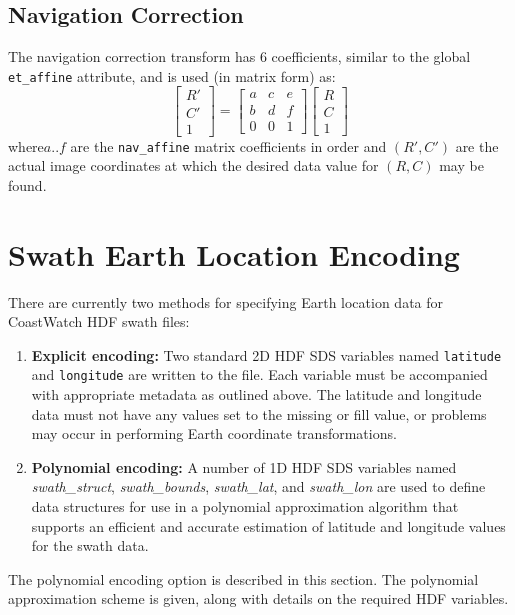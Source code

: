 \subsection{Navigation Correction}

The navigation correction transform has 6 coefficients, similar to
the global {\tt et\_affine} attribute, and is used (in matrix form)
as:
\[
  \left[ \begin{array}{c}
           R' \\
           C' \\
           1
         \end{array}  
  \right]
  = 
  \left[ \begin{array}{ccc}
           a & c & e \\
           b & d & f \\
           0 & 0 & 1
         \end{array}
  \right]
  \left[ \begin{array}{c}
           R \\
           C \\
           1
         \end{array}
  \right]
\]
where$a..f$ are the {\tt nav\_affine} matrix coefficients in order and
$(R',C')$ are the actual image coordinates at which the desired data
value for $(R,C)$ may be found.

\section{Swath Earth Location Encoding}
\label{swath}

There are currently two methods for specifying Earth location data for
CoastWatch HDF swath files: 
\begin{enumerate}

  \item \textbf{Explicit encoding:} Two standard 2D HDF SDS variables
  named {\tt latitude} and {\tt longitude} are written to the
  file. Each variable must be accompanied with appropriate metadata as
  outlined above. The latitude and longitude data must not have any
  values set to the missing or fill value, or problems may occur in
  performing Earth coordinate transformations.

  \item \textbf{Polynomial encoding:} A number of 1D HDF SDS variables
  named {\em swath\_struct}, {\em swath\_bounds}, {\em swath\_lat},
  and {\em swath\_lon} are used to define data structures for use in a
  polynomial approximation algorithm that supports an efficient and
  accurate estimation of latitude and longitude values for the swath
  data.

\end{enumerate}
The polynomial encoding option is described in this section. The
polynomial approximation scheme is given, along with details on the
required HDF variables.

